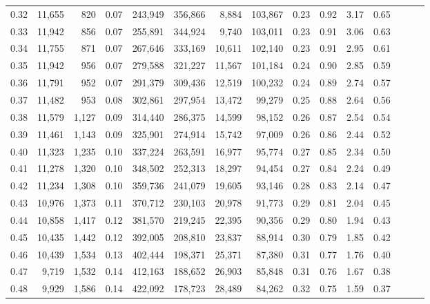 \begin{tabular}{rrrrrrrrrrrrrrr}
0.32 &  11,655 &    820 &  0.07 &  243,949 &  356,866 &    8,884 &  103,867 &  0.23 &  0.92 &  3.17 &      0.65 \\
0.33 &  11,942 &    856 &  0.07 &  255,891 &  344,924 &    9,740 &  103,011 &  0.23 &  0.91 &  3.06 &      0.63 \\
0.34 &  11,755 &    871 &  0.07 &  267,646 &  333,169 &   10,611 &  102,140 &  0.23 &  0.91 &  2.95 &      0.61 \\
0.35 &  11,942 &    956 &  0.07 &  279,588 &  321,227 &   11,567 &  101,184 &  0.24 &  0.90 &  2.85 &      0.59 \\
0.36 &  11,791 &    952 &  0.07 &  291,379 &  309,436 &   12,519 &  100,232 &  0.24 &  0.89 &  2.74 &      0.57 \\
0.37 &  11,482 &    953 &  0.08 &  302,861 &  297,954 &   13,472 &   99,279 &  0.25 &  0.88 &  2.64 &      0.56 \\
0.38 &  11,579 &  1,127 &  0.09 &  314,440 &  286,375 &   14,599 &   98,152 &  0.26 &  0.87 &  2.54 &      0.54 \\
0.39 &  11,461 &  1,143 &  0.09 &  325,901 &  274,914 &   15,742 &   97,009 &  0.26 &  0.86 &  2.44 &      0.52 \\
0.40 &  11,323 &  1,235 &  0.10 &  337,224 &  263,591 &   16,977 &   95,774 &  0.27 &  0.85 &  2.34 &      0.50 \\
0.41 &  11,278 &  1,320 &  0.10 &  348,502 &  252,313 &   18,297 &   94,454 &  0.27 &  0.84 &  2.24 &      0.49 \\
0.42 &  11,234 &  1,308 &  0.10 &  359,736 &  241,079 &   19,605 &   93,146 &  0.28 &  0.83 &  2.14 &      0.47 \\
0.43 &  10,976 &  1,373 &  0.11 &  370,712 &  230,103 &   20,978 &   91,773 &  0.29 &  0.81 &  2.04 &      0.45 \\
0.44 &  10,858 &  1,417 &  0.12 &  381,570 &  219,245 &   22,395 &   90,356 &  0.29 &  0.80 &  1.94 &      0.43 \\
0.45 &  10,435 &  1,442 &  0.12 &  392,005 &  208,810 &   23,837 &   88,914 &  0.30 &  0.79 &  1.85 &      0.42 \\
0.46 &  10,439 &  1,534 &  0.13 &  402,444 &  198,371 &   25,371 &   87,380 &  0.31 &  0.77 &  1.76 &      0.40 \\
0.47 &   9,719 &  1,532 &  0.14 &  412,163 &  188,652 &   26,903 &   85,848 &  0.31 &  0.76 &  1.67 &      0.38 \\
0.48 &   9,929 &  1,586 &  0.14 &  422,092 &  178,723 &   28,489 &   84,262 &  0.32 &  0.75 &  1.59 &      0.37 \\

\end{tabular}

